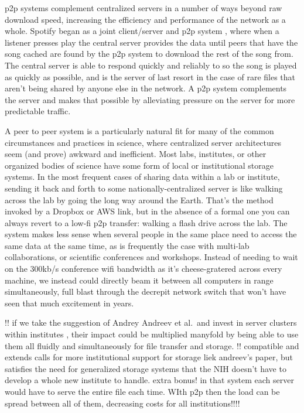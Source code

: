 \documentclass[notoc]{tufte-book}
\begin{document}
p2p systems complement centralized servers in a number of ways beyond
raw download speed, increasing the efficiency and performance of the
network as a whole. Spotify began as a joint client/server and p2p
system \citep{kreitzSpotifyLargeScale2010b} , where when a
listener presses play the central server provides the data until peers
that have the song cached are found by the p2p system to download the
rest of the song from. The central server is able to respond quickly and
reliably to so the song is played as quickly as possible, and is the
server of last resort in the case of rare files that aren't being shared
by anyone else in the network. A p2p system complements the server and
makes that possible by alleviating pressure on the server for more
predictable traffic.

A peer to peer system is a particularly natural fit for many of the
common circumstances and practices in science, where centralized server
architectures seem (and prove) awkward and inefficient. Most labs,
institutes, or other organized bodies of science have some form of local
or institutional storage systems. In the most frequent cases of sharing
data within a lab or institute, sending it back and forth to some
nationally-centralized server is like walking across the lab by going
the long way around the Earth. That's the method invoked by a Dropbox or
AWS link, but in the absence of a formal one you can always revert to a
low-fi p2p transfer: walking a flash drive across the lab. The system
makes less sense when several people in the same place need to access
the same data at the same time, as is frequently the case with multi-lab
collaborations, or scientific conferences and workshops. Instead of
needing to wait on the 300kb/s conference wifi bandwidth as it's
cheese-gratered across every machine, we instead could directly beam it
between all computers in range simultaneously, full blast through the
decrepit network switch that won't have seen that much excitement in
years.

!! if we take the suggestion of Andrey Andreev et al.~and invest in
server clusters within institutes \citep{andreevBiologistsNeedModern2021, charlesCommunityDrivenBigOpen2020} ,
their impact could be multiplied manyfold by being able to use them all
fluidly and simultaneously for file transfer and storage. !! compatible
and extends calls for more institutional support for storage liek
andreev's paper, but satisfies the need for generalized storage systems
that the NIH doesn't have to develop a whole new institute to handle.
extra bonus! in that system each server would have to serve the entire
file each time. WIth p2p then the load can be spread between all of
them, decreasing costs for all institutions!!!!
\end{document}
